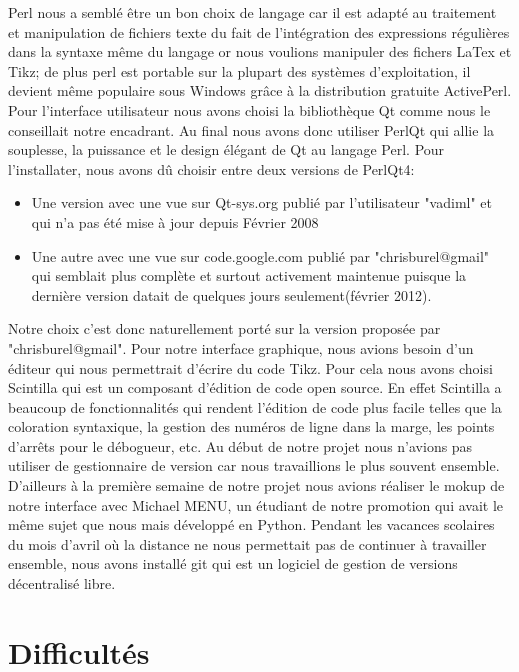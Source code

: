 \documentclass[a4paper]{report}
\begin{document}
Perl nous a semblé être un bon choix de langage car il est adapté au traitement et manipulation de fichiers texte du fait de l'intégration des expressions régulières dans la syntaxe même du langage or nous voulions manipuler des fichers LaTex et Tikz; de plus perl est portable sur la plupart des systèmes d'exploitation, il devient même populaire sous Windows grâce à la distribution gratuite ActivePerl. 
Pour l'interface utilisateur nous avons choisi la bibliothèque Qt comme nous le conseillait notre encadrant. Au final nous avons donc utiliser PerlQt qui allie la souplesse, la puissance et le design élégant de Qt au langage Perl. Pour l'installater, nous avons dû choisir entre deux versions de PerlQt4:
\begin{itemize}
 \item Une version avec une vue sur Qt-sys.org publié par l'utilisateur "vadiml" et qui n'a pas été mise à jour depuis Février 2008
 \item Une autre avec une vue sur code.google.com publié par "chrisburel@gmail" qui semblait plus complète et surtout activement maintenue puisque la dernière version datait de quelques jours seulement(février 2012).
\end{itemize}
  Notre choix c'est donc naturellement porté sur la version proposée par "chrisburel@gmail".
  \newline 
  Pour notre interface graphique, nous avions besoin d'un éditeur qui nous permettrait d'écrire du code Tikz. Pour cela nous avons choisi Scintilla qui est un composant d'édition de code open source. En effet Scintilla a beaucoup de fonctionnalités qui rendent l'édition de code plus facile telles que la coloration syntaxique, la gestion des numéros de ligne dans la marge, les points d'arrêts pour le débogueur, etc.
  \newline
  Au début de notre projet nous n'avions pas utiliser de gestionnaire de version car nous travaillions le plus souvent ensemble. D'ailleurs à la première semaine de notre projet nous avions réaliser le mokup de notre interface avec Michael MENU, un étudiant de notre promotion qui avait le même sujet que nous mais développé en Python. Pendant les vacances scolaires du mois d'avril où la distance ne nous permettait pas de continuer à travailler ensemble, nous avons installé git qui est un logiciel de gestion de versions décentralisé libre. 

\section{Difficultés}
\end{document}
